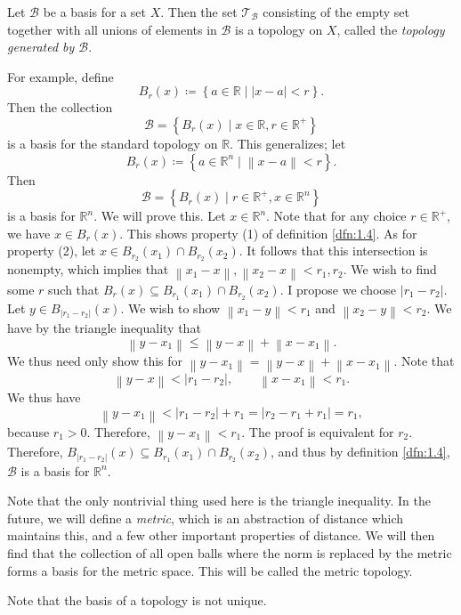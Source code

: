 \begin{definition}\label{dfn:1.5}
	Let $\mathcal{B} $ be a basis for a set $X$. Then the set $\mathcal{T} _\mathcal{B} $ consisting of the empty set together with all unions of elements in $\mathcal{B} $ is a topology on $X$, called the \emph{topology generated by $\mathcal{B} $}.
\end{definition}

For example, define 
\[
	B_r(x)\coloneqq \left\{ a\in\mathbb{R} \mid \left| x-a \right| <r \right\} 
.\]
Then the collection
\[
	\mathcal{B} =\left\{ B_r(x) \mid x\in \mathbb{R},r\in\mathbb{R}^+\right\} 
\]
is a basis for the standard topology on $\mathbb{R}$. This generalizes; let
\[
	B_r(x)\coloneqq \left\{ a\in\mathbb{R}^n \mid \left\lVert x-a \right\rVert <r \right\} 
.\]
Then
\[
	\mathcal{B} =\left\{ B_r(x) \mid r\in\mathbb{R}^+,x\in\mathbb{R}^n \right\} 
\]
is a basis for $\mathbb{R}^n$. We will prove this. Let $x\in \mathbb{R}^n$. Note that for any choice $r\in\mathbb{R}^+$, we have $x\in B_r(x)$. This shows property (1) of definition \ref{dfn:1.4}. As for property (2), let $x\in B_{r_2}(x_1)\cap B_{r_2}(x_2)$. It follows that this intersection is nonempty, which implies that $\left\lVert x_1-x \right\rVert ,\left\lVert x_2-x \right\rVert <r_1,r_2$.  We wish to find some $r$ such that $B_r(x)\subseteq B_{r_1}(x_1)\cap B_{r_2}(x_2)$. I propose we choose $\left| r_1 -r_2\right|$. Let $y\in B_{\left| r_1-r_2 \right| }(x)$. We wish to show $\left\lVert x_1-y \right\rVert <r_1$ and $\left\lVert x_2-y \right\rVert <r_2$. We have by the triangle inequality that
\[
	\left\lVert y-x_1 \right\rVert \leq \left\lVert y-x \right\rVert +\left\lVert x-x_1 \right\rVert 
.\]
We thus need only show this for $\left\lVert y-x_1 \right\rVert =\left\lVert y-x \right\rVert+\left\lVert x-x_1 \right\rVert  $. Note that
\[
	\left\lVert y-x \right\rVert <\left| r_1-r_2 \right| ,\qquad \left\lVert x-x_1 \right\rVert <r_1
.\]
We thus have
\[
	\left\lVert y-x_1 \right\rVert <\left| r_1-r_2 \right| +r_1=\left| r_2-r_1+r_1 \right| =r_1
,\]
because $r_1>0$. Therefore, $\left\lVert y-x_1 \right\rVert <r_1$. The proof is equivalent for $r_2$. Therefore, $B_{\left| r_1-r_2 \right| }(x)\subseteq B_{r_1}(x_1)\cap B_{r_2}(x_2)$, and thus by definition \ref{dfn:1.4}, $\mathcal{B} $ is a basis for $\mathbb{R}^n$.

Note that the only nontrivial thing used here is the triangle inequality. In the future, we will define a \emph{metric}, which is an abstraction of distance which maintains this, and a few other important properties of distance. We will then find that the collection of all open balls where the norm is replaced by the metric forms a basis for the metric space. This will be called the metric topology.

Note that the basis of a topology is not unique.
